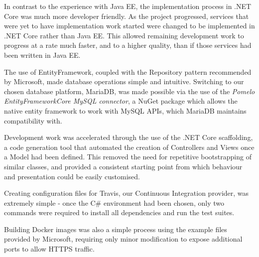 In contrast to the experience with Java EE, the implementation process in .NET Core was much more developer friendly.  As the project progressed, services that were yet to have implementation work started were changed to be implemented in .NET Core rather than Java EE.  This allowed remaining development work to progress at a rate much faster, and to a higher quality, than if those services had been written in Java EE.

The use of EntityFramework, coupled with the Repository pattern\cite{dotnet_repository_pattern} recommended by Microsoft, made database operations simple and intuitive.  Switching to our chosen database platform, MariaDB, was made possible via the use of the \textit{Pomelo EntityFrameworkCore MySQL connector}\cite{Pomelo}, a NuGet package which allows the native entity framework to work with MySQL APIs, which MariaDB maintains compatibility with.

Development work was accelerated through the use of the .NET Core scaffolding, a code generation tool that automated the creation of Controllers and Views once a Model had been defined.  This removed the need for repetitive bootstrapping of similar classes, and provided a consistent starting point from which behaviour and presentation could be easily customised.

Creating configuration files for Travis, our Continuous Integration provider, was extremely simple - once the C# environment had been chosen, only two commands were required to install all dependencies and run the test suites.

Building Docker images was also a simple process using the example files provided by Microsoft\cite{dotnet_docker}, requiring only minor modification to expose additional ports to allow HTTPS traffic.

